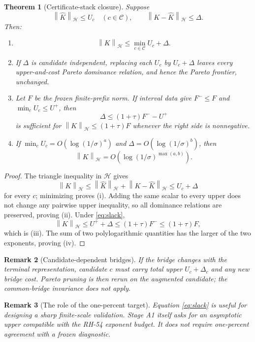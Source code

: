 \documentclass[11pt]{article}
\newtheorem{theorem}{Theorem}[section]
\newtheorem{remark}[theorem]{Remark}
\theoremstyle{definition}
\newcommand{\norm}[1]{\left\lVert#1\right\rVert}
\newcommand{\HH}{\mathcal H}
\begin{document}
\begin{theorem}[Certificate-stack closure]
\label{thm:stack}
Suppose
\[
 \norm{\widehat K}_{\HH}\le U_c
 \quad(c\in\mathcal C),
 \qquad
 \norm{K-\widehat K}_{\HH}\le\Delta.
\]
Then:
\begin{enumerate}[label=(\roman*),leftmargin=2.2em]
 \item
 \[
  \norm K_{\HH}\le \min_{c\in\mathcal C}U_c+\Delta.
 \]
 \item If $\Delta$ is candidate independent, replacing each $U_c$ by
       $U_c+\Delta$ leaves every upper-and-cost Pareto dominance relation,
       and hence the Pareto frontier, unchanged.
 \item Let $F$ be the frozen finite-prefix norm.  If interval data give
       $F^-\le F$ and $\min_cU_c\le U^+$, then
 \begin{equation}
  \Delta\le (1+\tau)F^- - U^+
  \label{eq:slack}
 \end{equation}
 is sufficient for $\norm K_{\HH}\le(1+\tau)F$ whenever the right side is
 nonnegative.
 \item If $\min_cU_c=O(\log(1/\sigma)^a)$ and
       $\Delta=O(\log(1/\sigma)^b)$, then
 \[
  \norm K_{\HH}
  =O\!\left(\log(1/\sigma)^{\max(a,b)}\right).
 \]
\end{enumerate}
\end{theorem}

\begin{proof}
The triangle inequality in $\HH$ gives
\[
 \norm K_{\HH}\le\norm{\widehat K}_{\HH}
                  +\norm{K-\widehat K}_{\HH}
 \le U_c+\Delta
\]
for every $c$; minimizing proves (i).  Adding the same scalar to every upper
does not change any pairwise upper inequality, so all dominance relations
are preserved, proving (ii).  Under \eqref{eq:slack},
\[
 \norm K_{\HH}\le U^++\Delta
 \le(1+\tau)F^-\le(1+\tau)F,
\]
which is (iii).  The sum of two polylogarithmic quantities has the larger of
the two exponents, proving (iv).
\end{proof}

\begin{remark}[Candidate-dependent bridges]
If the bridge changes with the terminal representation, candidate $c$ must
carry total upper $U_c+\Delta_c$ and any new bridge cost.  Pareto pruning is
then rerun on the augmented candidate; the common-bridge invariance does not
apply.
\end{remark}

\begin{remark}[The role of the one-percent target]
Equation \eqref{eq:slack} is useful for designing a sharp finite-scale
validation.  Stage A1 itself asks for an asymptotic upper compatible with the
RH-54 exponent budget.  It does not require one-percent agreement with a
frozen diagnostic.
\end{remark}
\end{document}
